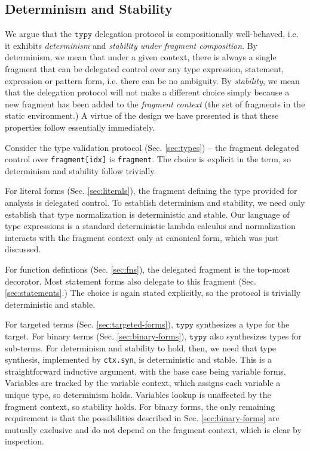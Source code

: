 \documentclass[preprint,10pt]{sigplanconf}
\newcommand{\typy}{\texttt{typy}}
\newcommand{\lip}[1]{\lstinline[language=Python,basicstyle=\ttfamily\footnotesize,deletendkeywords={tuple,buffer,map}]{#1}}
\newcommand{\li}[1]{\lip{#1}}
\begin{document}
\subsection{Determinism and Stability}
We argue that the $\typy$ delegation protocol is compositionally well-behaved, i.e. it exhibits \emph{determinism} and \emph{stability under fragment composition}. By {determinism}, we mean that under a given context, there is always a single fragment that can be delegated control over any type expression, statement, expression or pattern form, i.e. there can be no ambiguity. By \emph{stability}, we mean that the delegation protocol will not make a different choice simply because a new fragment has been added to the \emph{fragment context} (the set of fragments in the static environment.) A virtue of the design we have presented is that these properties follow essentially immediately.

Consider the type validation protocol (Sec. \ref{sec:types}) -- the fragment delegated control over \li{fragment[idx]} is \li{fragment}. The choice is explicit in the term, so determinism and stability follow trivially.

For literal forms (Sec. \ref{sec:literals}), the fragment defining the type provided for analysis is delegated control. To establish determinism and stability, we need only establish that type normalization is deterministic and stable. Our language of type expressions is a standard deterministic lambda calculus \cite{DBLP:conf/lfmtp/Crary09} and normalization interacts with the fragment context only at canonical form, which was just discussed.

For function defintions (Sec. \ref{sec:fns}), the delegated fragment is the top-most decorator, Most statement forms also delegate to this fragment (Sec. \ref{sec:statements}.) The choice is again stated explicitly, so the protocol is trivially deterministic and stable.

For targeted terms (Sec. \ref{sec:targeted-forms}), $\typy$ synthesizes a type for the target. For binary terms (Sec. \ref{sec:binary-forms}), $\typy$ also synthesizes types for sub-terms. For determinism and stability to hold, then, we need that type synthesis, implemented by \li{ctx.syn}, is deterministic and stable. This is a straightforward inductive argument, with the base case being variable forms. Variables are tracked by the variable context, which assigns each variable a unique type, so determinism holds. Variables lookup is unaffected by the fragment context, so stability holds. For binary forms, the only remaining requirement is that the possibilities described in Sec. \ref{sec:binary-forms} are mutually exclusive and do not depend on the fragment context, which is clear by inspection.
\end{document}
